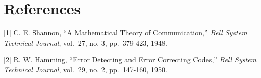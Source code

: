\documentclass[11pt,oneside]{book}
\newcommand{\BuiltInTok}[1]{\textcolor[rgb]{0.00,0.50,0.00}{#1}}
\newcommand{\ControlFlowTok}[1]{\textcolor[rgb]{0.00,0.44,0.13}{\textbf{#1}}}
\newcommand{\DecValTok}[1]{\textcolor[rgb]{0.25,0.63,0.44}{#1}}
\newcommand{\KeywordTok}[1]{\textcolor[rgb]{0.00,0.44,0.13}{\textbf{#1}}}
\newcommand{\NormalTok}[1]{#1}
\newcommand{\OperatorTok}[1]{\textcolor[rgb]{0.40,0.40,0.40}{#1}}
\newcommand{\SpecialCharTok}[1]{\textcolor[rgb]{0.25,0.44,0.63}{#1}}
\newcommand{\SpecialStringTok}[1]{\textcolor[rgb]{0.73,0.40,0.53}{#1}}
\newcommand{\StringTok}[1]{\textcolor[rgb]{0.25,0.44,0.63}{#1}}
\newcommand{\VariableTok}[1]{\textcolor[rgb]{0.10,0.09,0.49}{#1}}
\theoremstyle{plain}
\theoremstyle{definition}
\theoremstyle{remark}
\begin{document}
%
%
%


\backmatter
\chapter*{References}\label{sec:references}

{[}1{]} C. E. Shannon, ``A Mathematical Theory of Communication,''
\emph{Bell System Technical Journal}, vol.~27, no. 3, pp.~379-423, 1948.

{[}2{]} R. W. Hamming, ``Error Detecting and Error Correcting Codes,''
\emph{Bell System Technical Journal}, vol.~29, no. 2, pp.~147-160, 1950.
\end{document}
